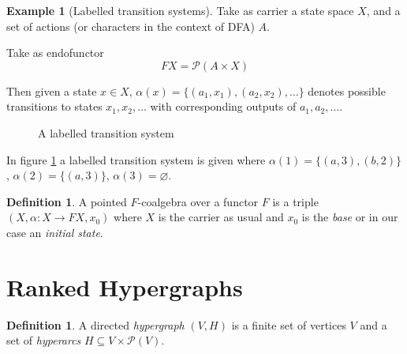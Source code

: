 \documentclass[12pt]{article}
\theoremstyle{definition}
\newtheorem{definition}[theorem]{Definition}
\newtheorem{example}[theorem]{Example}
\renewcommand{\P}{\mathcal{P}}
\newcommand{\1}{\mathbbm{1}}
\begin{document}
\begin{example}[Labelled transition systems]
    Take as carrier a state space $X$, and a set of actions (or characters in the context of DFA) $A$.

    Take as endofunctor 
    \[
        FX = \P(A\times X)
    \]

    Then given a state $x\in X$, $\alpha(x) = \{(a_1, x_1),(a_2, x_2), \dots\}$ denotes possible transitions to states $x_1, x_2, \dots$ with corresponding outputs of $a_1, a_2, \dots$.
    \begin{figure}[h]
        \centering
        \label{ex-lab_tran_sys}
        \caption{A labelled transition system}
    \end{figure}

    In figure \ref{ex-lab_tran_sys} a labelled transition system is given where $\alpha(1) = \{(a,3),(b,2)\}$, $\alpha(2) = \{(a,3)\}$, $\alpha(3) = \varnothing$.
\end{example}

\begin{definition}
    A pointed $F$-coalgebra over a functor $F$ is a triple $(X, \alpha: X\to FX, x_0)$ where $X$ is the carrier as usual and $x_0$ is the \emph{base} or in our case an \emph{initial state}.
\end{definition}

\newpage
\section{Ranked Hypergraphs}
\begin{definition}
    A directed \emph{hypergraph} $(V,H)$ is a finite set of vertices $V$ and a set of \emph{hyperarcs} $H\subseteq V\times\P(V)$.
\end{definition}
\end{document}
